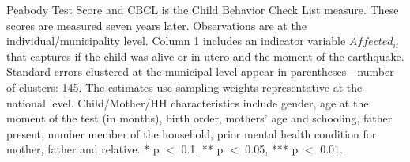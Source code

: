 \begin{table}[htbp]
\begin{minipage}{345pt}
{Peabody Test Score and CBCL is the Child Behavior Check List measure. These
scores are measured seven years later. Observations are at the
individual/municipality level. Column 1 includes an indicator variable
$Affected_{it}$ that captures if the child was alive or in utero and the
moment of the earthquake. Standard errors clustered at the municipal level
appear in parentheses---number of clusters: 145. The estimates use sampling
weights representative at the national level. Child/Mother/HH
characteristics include gender, age at the moment of the test (in months),
birth order, mothers' age and schooling, father present, number member of
the household, prior mental health condition for mother, father and
relative. * p $<$ 0.1, ** p $<$ 0.05, *** p $<$ 0.01.\par}
\end{minipage}
\end{table}
